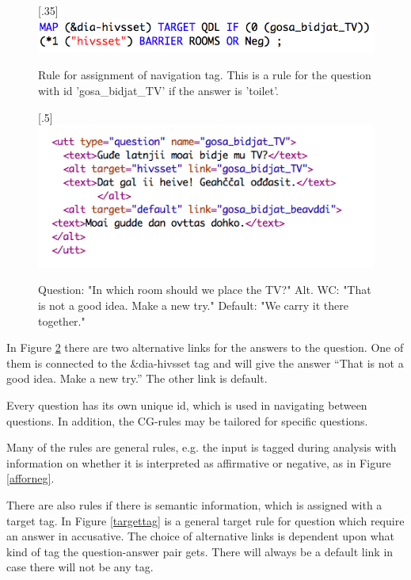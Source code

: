 \documentclass[11pt]{article}
\begin{document}
\begin{figure}%
\begin{center}
\scalebox{.35}[.35]{\includegraphics{presentation/img/hivsset_tag.png}}\\
\caption{Rule for assignment of navigation tag. This is a rule for the question with id 'gosa\_bidjat\_TV' if the answer is 'toilet'.}
\label{hivssettag}
\end{center}
\end{figure}



\begin{figure}%
\begin{center}
\scalebox{.5}[.5]{\includegraphics{presentation/img/gosabidjatTV.png}}\\
\caption{Question: "In which room should we place the TV?"
Alt. WC: "That is not a good idea. Make a new try." 
Default: "We carry it there together." 
}
\label{altlinks}
\end{center}
\end{figure}

In Figure \ref{altlinks} there are two alternative links for the answers to the question. One of them is connected to the \&dia-hivsset tag and will give the answer “That is not a good idea. Make a new try.” The other link is default. 

Every question has its own unique id, which is used in navigating between questions. In addition, the CG-rules may be tailored for specific questions.  

Many of the rules are general rules, e.g. the input is tagged during analysis with information on whether it is interpreted as affirmative or negative, as in Figure \ref{afforneg}.

There are also rules if there is semantic information, which is assigned with a target tag. In Figure \ref{targettag} is a general target rule for question which require an answer in accusative. The choice of alternative links is dependent upon what kind of tag the question-answer pair gets. There will always be a default link in case there will not be any tag. 
 
\end{document}
